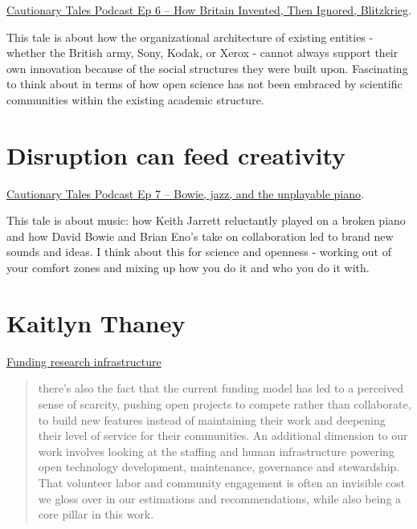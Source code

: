 \documentclass[
  letterpaper,
  DIV=11,
  numbers=noendperiod]{scrreprt}
\begin{document}
\href{http://timharford.com/2019/12/cautionary-tales-ep-6-how-britain-invented-then-ignored-blitzkrieg/}{Cautionary
Tales Podcast Ep 6 -- How Britain Invented, Then Ignored, Blitzkrieg}.

This tale is about how the organizational architecture of existing
entities - whether the British army, Sony, Kodak, or Xerox - cannot
always support their own innovation because of the social structures
they were built upon. Fascinating to think about in terms of how open
science has not been embraced by scientific communities within the
existing academic structure.

\hypertarget{disruption-can-feed-creativity}{%
\section{Disruption can feed
creativity}\label{disruption-can-feed-creativity}}

\href{http://timharford.com/2019/12/cautionary-tales-ep-7-bowie-jazz-and-the-unplayable-piano/}{Cautionary
Tales Podcast Ep 7 -- Bowie, jazz, and the unplayable piano}.

This tale is about music: how Keith Jarrett reluctantly played on a
broken piano and how David Bowie and Brian Eno's take on collaboration
led to brand new sounds and ideas. I think about this for science and
openness - working out of your comfort zones and mixing up how you do it
and who you do it with.

\hypertarget{kaitlyn-thaney}{%
\section{Kaitlyn Thaney}\label{kaitlyn-thaney}}

\href{https://www.force11.org/blog/infrastructure-series-funding-research-infrastructure}{Funding
research infrastructure}

\begin{quote}
there's also the fact that the current funding model has led to a
perceived sense of scarcity, pushing open projects to compete rather
than collaborate, to build new features instead of maintaining their
work and deepening their level of service for their communities. An
additional dimension to our work involves looking at the staffing and
human infrastructure powering open technology development, maintenance,
governance and stewardship. That volunteer labor and community
engagement is often an invisible cost we gloss over in our estimations
and recommendations, while also being a core pillar in this work.
\end{quote}
\end{document}
